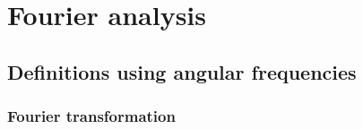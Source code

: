 \documentclass[
twoside,
openright,
titlepage,
numbers=noenddot,
headinclude,
fleqn,
a4paper,
footinclude=true,
cleardoublepage=empty,
abstractoff,
BCOR=5mm,
paper=a4,
fontsize=11pt,
british,ngerman,american,
]{scrreprt}
\begin{document}
\appendix
{}
\cleardoublepage
{}
{}


\chapter{Fourier analysis}
\label{cha:fourier-analysis}

\section{Definitions using angular frequencies}
\label{sec:fourier-k}

\subsection{Fourier transformation}
\label{sec:ft-k}
\end{document}
